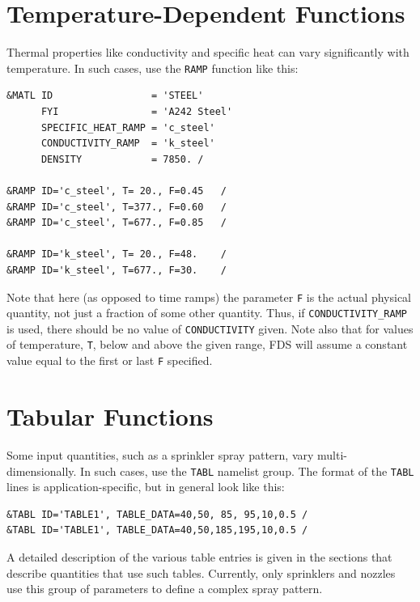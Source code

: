 \documentclass[11pt]{book}
\newcommand{\ct}{\tt\small}
\begin{document}
\newpage

\section{Temperature-Dependent Functions}

\label{info:RAMP_Temperature}

Thermal properties like conductivity and specific heat can vary significantly with temperature. In such cases, use
the {\ct RAMP} function like this:

\footnotesize
\begin{verbatim}
&MATL ID                 = 'STEEL'
      FYI                = 'A242 Steel'
      SPECIFIC_HEAT_RAMP = 'c_steel'
      CONDUCTIVITY_RAMP  = 'k_steel'
      DENSITY            = 7850. /

&RAMP ID='c_steel', T= 20., F=0.45   /
&RAMP ID='c_steel', T=377., F=0.60   /
&RAMP ID='c_steel', T=677., F=0.85   /

&RAMP ID='k_steel', T= 20., F=48.    /
&RAMP ID='k_steel', T=677., F=30.    /
\end{verbatim}
\normalsize

\noindent
Note that here (as opposed to time ramps) the parameter {\ct F} is the actual physical quantity, not just
a fraction of some other quantity. Thus, if {\ct CONDUCTIVITY\_RAMP} is used, there should be no
value of {\ct CONDUCTIVITY} given. Note also that for values of temperature, {\ct T}, below and above the
given range, FDS will assume a constant value equal to the first or last {\ct F} specified.



\section{Tabular Functions}

\label{info:TABL}

Some input quantities, such as a sprinkler spray pattern, vary multi-dimensionally. In such cases, use
the {\ct TABL} namelist group. The format of the {\ct TABL} lines is application-specific, but in general look like this:

\footnotesize
\begin{verbatim}
&TABL ID='TABLE1', TABLE_DATA=40,50, 85, 95,10,0.5 /
&TABL ID='TABLE1', TABLE_DATA=40,50,185,195,10,0.5 /
\end{verbatim}
\normalsize

\noindent
A detailed description of the various table entries is given in the sections that describe quantities that use such
tables. Currently, only sprinklers and nozzles use this group of parameters to define a complex spray pattern.
\end{document}
